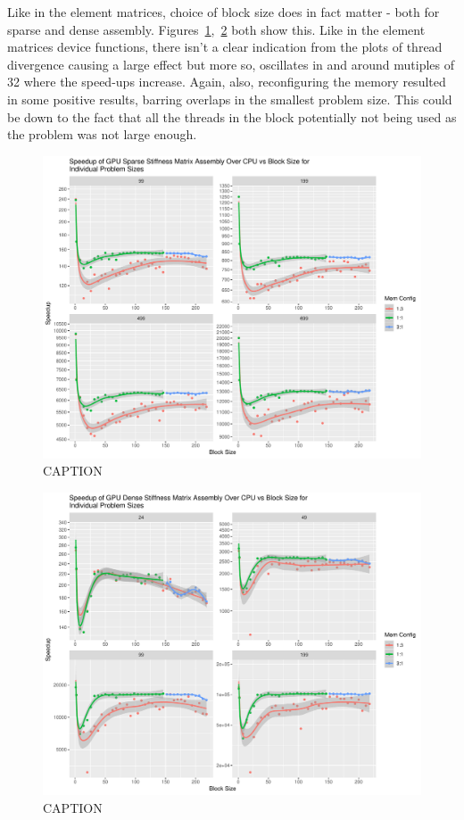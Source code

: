 Like in the element matrices, choice of block size does in fact matter - both for sparse and dense assembly. Figures~\ref{fig:assem_sparse_reconfig},~\ref{fig:assem_dense_reconfig} both show this. Like in the element matrices device functions, there isn't a clear indication from the plots of thread divergence causing a large effect but more so, oscillates in and around mutiples of 32 where the speed-ups increase. Again, also, reconfiguring the memory resulted in some positive results, barring overlaps in the smallest problem size. This could be down to the fact that all the threads in the block potentially not being used as the problem was not large enough.

\begin{figure}
	\centering
	\includegraphics[width=0.9\linewidth]{Plots/assem_dev_sparse_speedups_reconfig}
	\caption{CAPTION}
	\label{fig:assem_sparse_reconfig}
\end{figure}

\begin{figure}
	\centering
	\includegraphics[width=0.9\linewidth]{Plots/assem_dev_dense_speedups_reconfig}
	\caption{CAPTION}
	\label{fig:assem_dense_reconfig}
\end{figure}


